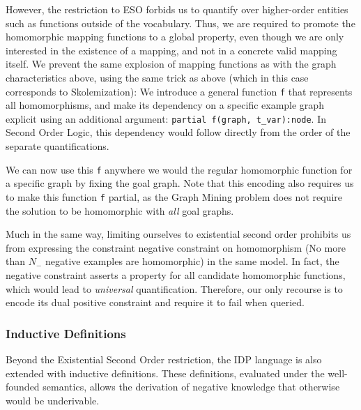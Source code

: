 \documentclass{article}
\theoremstyle{definition}
\begin{document}
However, the restriction to ESO forbids us to quantify over higher-order entities such as functions outside of the vocabulary.
Thus, we are required to promote the homomorphic mapping functions to a global property, even though we are only interested in the existence of a mapping, and not in a concrete valid mapping itself.
We prevent the same explosion of mapping functions as with the graph characteristics above, using the same trick as above (which in this case corresponds to Skolemization):
We introduce a general function \verb|f| that represents all homomorphisms, and make its dependency on a specific example graph explicit using an additional argument:
\verb|partial f(graph, t_var):node|.
In Second Order Logic, this dependency would follow directly from the order of the separate quantifications.

We can now use this \verb|f| anywhere we would the regular homomorphic function for a specific graph by fixing the goal graph.
Note that this encoding also requires us to make this function \verb|f| partial, as the Graph Mining problem does not require the solution to be homomorphic with \emph{all} goal graphs.

Much in the same way, limiting ourselves to existential second order prohibits us from expressing the constraint negative constraint on homomorphism (No more than $N_{-}$ negative examples are homomorphic) in the same model.
In fact, the negative constraint asserts a property for all candidate homomorphic functions, which would lead to \emph{universal} quantification.
Therefore, our only recourse is to encode its dual positive constraint and require it to fail when queried.

\subsubsection{Inductive Definitions}
Beyond the Existential Second Order restriction, the IDP language is also extended with inductive definitions. These definitions, evaluated under the well-founded semantics, allows the derivation of negative knowledge that otherwise would be underivable.
\reversemarginpar
{}
\end{document}
